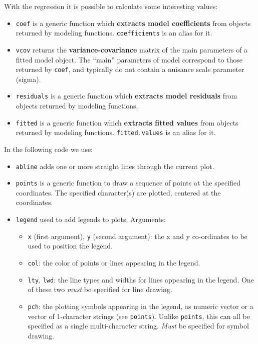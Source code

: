 \documentclass[a4paper]{article}
\newcommand{\dquotes}[1]{``#1''}
\begin{document}
    With the regression it is possible to calculate some interesting values:
    \begin{itemize}
        \item \texttt{coef} is a generic function which \textbf{extracts model coefficients} from objects returned by modeling functions. \texttt{coefficients} is an alias for it.

        \item \texttt{vcov} returns the \textbf{variance-covariance} matrix of the main parameters of a fitted model object. The \dquotes{main} parameters of model correspond to those returned by \texttt{coef}, and typically do not contain a nuisance scale parameter (sigma).

        \item \texttt{residuals} is a generic function which \textbf{extracts model residuals} from objects returned by modeling functions.

        \item \texttt{fitted} is a generic function which \textbf{extracts fitted values} from objects returned by modeling functions. \texttt{fitted.values} is an alias for it.
    \end{itemize}
    In the following code we use:
    \begin{itemize}
        \item \texttt{abline} adds one or more straight lines through the current plot.

        \item \texttt{points} is a generic function to draw a sequence of points at the specified coordinates. The specified character(s) are plotted, centered at the coordinates.

        \item \texttt{legend} used to add legends to plots. Arguments:
        \begin{itemize}
            \item \texttt{x} (first argument), \texttt{y} (second argument): the x and y co-ordinates to be used to position the legend.

            \item \texttt{col}: the color of points or lines appearing in the legend.

            \item \texttt{lty}, \texttt{lwd}: the line types and widths for lines appearing in the legend. One of these two \emph{must} be specified for line drawing.

            \item \texttt{pch}: the plotting symbols appearing in the legend, as numeric vector or a vector of 1-character strings (see \texttt{points}). Unlike \texttt{points}, this can all be specified as a single multi-character string. \emph{Must} be specified for symbol drawing.
        \end{itemize}
    \end{itemize}
    
\end{document}
